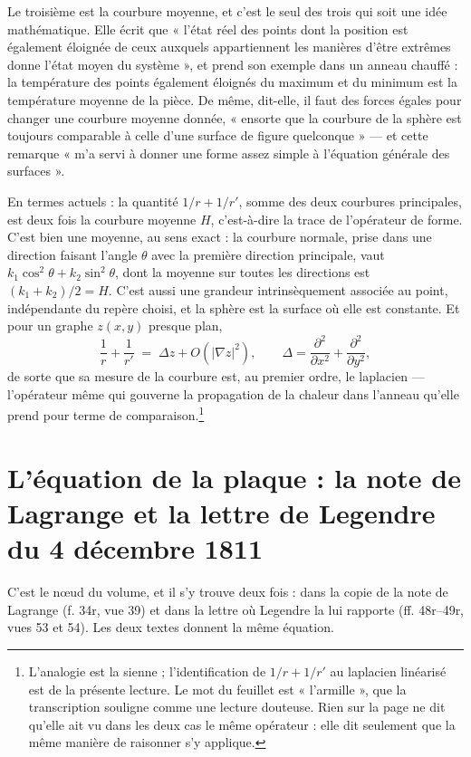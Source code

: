 \documentclass[11pt,a4paper]{article}
\begin{document}
Le troisième est la courbure moyenne, et c'est le seul des trois qui soit une
idée mathématique. Elle écrit que « l'état réel des points dont la position
est également éloignée de ceux auxquels appartiennent les manières d'être
extrêmes donne l'état moyen du système », et prend son exemple dans un anneau
chauffé : la température des points également éloignés du maximum et du
minimum est la température moyenne de la pièce. De même, dit-elle, il faut des
forces égales pour changer une courbure moyenne donnée, « ensorte que la
courbure de la sphère est toujours comparable à celle d'une surface de figure
quelconque » — et cette remarque « m'a servi à donner une forme assez simple à
l'équation générale des surfaces ».

En termes actuels : la quantité $1/r + 1/r'$, somme des deux courbures
principales, est deux fois la courbure moyenne $H$, c'est-à-dire la trace de
l'opérateur de forme. C'est bien une moyenne, au sens exact : la courbure
normale, prise dans une direction faisant l'angle $\theta$ avec la première
direction principale, vaut $k_1\cos^2\theta + k_2\sin^2\theta$, dont la
moyenne sur toutes les directions est $(k_1+k_2)/2 = H$. C'est aussi une
grandeur intrinsèquement associée au point, indépendante du repère choisi,
et la sphère est la surface où elle est constante. Et pour un graphe
$z(x,y)$ presque plan,
\[
  \frac{1}{r} + \frac{1}{r'} \;=\; \Delta z + O\!\left(|\nabla z|^2\right),
  \qquad \Delta = \frac{\partial^2}{\partial x^2} + \frac{\partial^2}{\partial y^2},
\]
de sorte que sa mesure de la courbure est, au premier ordre, le laplacien —
l'opérateur même qui gouverne la propagation de la chaleur dans l'anneau
qu'elle prend pour terme de comparaison.\footnote{L'analogie est la sienne ;
l'identification de $1/r+1/r'$ au laplacien linéarisé est de la présente
lecture. Le mot du feuillet est « l'armille », que la transcription souligne
comme une lecture douteuse. Rien sur la page ne dit qu'elle ait vu dans les
deux cas le même opérateur : elle dit seulement que la même manière de
raisonner s'y applique.}

\section*{L'équation de la plaque : la note de Lagrange et la lettre de Legendre du 4 décembre 1811}

C'est le nœud du volume, et il s'y trouve deux fois : dans la copie de la note
de Lagrange (f. 34r, vue 39) et dans la lettre où Legendre la lui rapporte
(ff. 48r–49r, vues 53 et 54). Les deux textes donnent la même équation.
\end{document}
